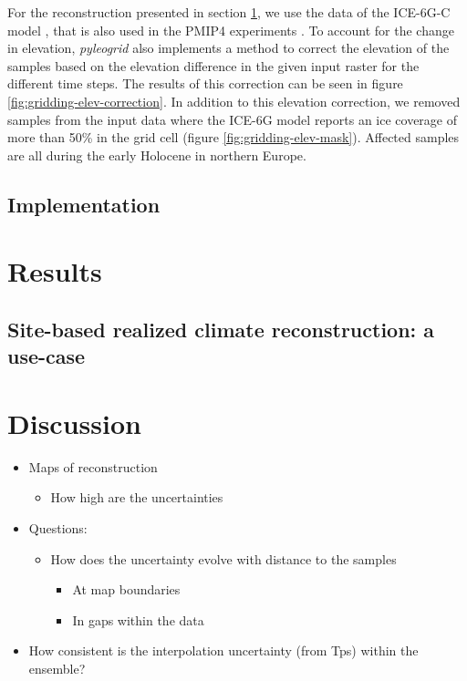 \begin{refsection}
For the reconstruction presented in section \ref{sec:gridding-results}, we use the data of the ICE-6G-C model \citep{ArgusPeltierDrummondEtAl2014, PeltierArgusDrummond2015}, that is also used in the PMIP4 experiments \citep{IvanovicGregoireKageyamaEtAl2016, Otto-BliesnerBraconnotHarrisonEtAl2017, KageyamaBraconnotHarrisonEtAl2018}. To account for the change in elevation, \textit{pyleogrid} also implements a method to correct the elevation of the samples based on the elevation difference in the given input raster for the different time steps. The results of this correction can be seen in figure \ref{fig:gridding-elev-correction}. In addition to this elevation correction, we removed samples from the input data where the ICE-6G model reports an ice coverage of more than 50\% in the grid cell (figure \ref{fig:gridding-elev-mask}). Affected samples are all during the early Holocene in northern Europe.

\subsection{Implementation}  \label{sec:gridding-package}

\section{Results}  \label{sec:gridding-results}

\subsection{Site-based realized climate reconstruction: a use-case} \label{sec:gridding-site}

\section{Discussion}  \label{sec:gridding-discussion}

\begin{itemize}
	\item Maps of reconstruction
	\begin{itemize}
		\item How high are the uncertainties
	\end{itemize}
	\item Questions: 
	\begin{itemize}
		\item How does the uncertainty evolve with distance to the samples
		\begin{itemize}
			\item At map boundaries
			\item In gaps within the data
		\end{itemize}
	\end{itemize}
	\item How consistent is the interpolation uncertainty (from Tps) within the ensemble?
\end{itemize}



\end{refsection}
